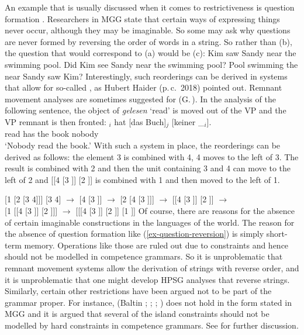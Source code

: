 \documentclass[output=paper,biblatex,babelshorthands,newtxmath,draftmode,colorlinks,citecolor=brown]{langscibook}
\begin{document}
An example that is usually discussed when it comes to restrictiveness is question
formation \citep{MMGRRBW2003a}. Researchers in MGG state that certain ways of expressing things never occur, although
they may be imaginable. So some may ask why questions are never formed by reversing the
order of words in a string. So rather than (b), the question that would correspond to
(a) would be (c):
\eal
\ex Kim saw Sandy near the swimming pool.
\ex Did Kim see Sandy near the swimming pool?
\ex\label{ex-question-reversion} 
Pool swimming the near Sandy saw Kim?
\zl
\largerpage
Interestingly, such reorderings can be derived in systems that allow for so-called
\emph{}, as Hubert Haider (p.\,c.\ 2018) pointed
out. Remnant movement analyses are sometimes suggested for 
(G.\,\citealp{GMueller98a}). In the analysis of the following sentence, the object of \emph{gelesen}
`read' is moved out of the VP and the VP remnant is then fronted:
\ea
{}$_i$ hat [das Buch]$_j$ [keiner \_$_i$].\\
     {}        {}     read         has \spacebr{}the book \spacebr{}nobody\\
\glt `Nobody read the book.'
\z
\noindent
With such a system in place, the reorderings can be derived as follows: the element 3 is combined
with 4, 4 moves to the left of 3. The result is combined with 2 and then the unit containing 3
and 4 can move to the left of 2 and [[4 [3 \trace]] [2 \trace]] is combined with 1 and then moved to the left of 1.

\eal
\ex{} [1 [2 [3 4]]] 
\ex {} [3 4] $\to$ [4 [3 \trace]] $\to$ [2 [4 [3 \trace]]] $\to$ [[4 [3 \trace]] [2 \trace]] $\to$\\
    {} [1 [[4 [3 \trace]] [2 \trace]]] $\to$ [[[4 [3 \trace]] [2 \trace]] [1 \trace]]
\zl
Of course, there are reasons for the absence of certain imaginable constructions in the languages of
the world. The reason for the absence of question formation like (\ref{ex-question-reversion}) is
simply short-term memory. Operations like those are ruled out due to  constraints and
hence should not be modelled in competence grammars. So it is unproblematic that remnant movement
systems allow the derivation of strings with reverse order, and it is unproblematic that one might
develop HPSG analyses that reverse strings. Similarly, certain other restrictions have been argued
not to be part of the grammar proper. For instance,  (Baltin \citeyear[]{Baltin81a};
\citeyear{Baltin2006a}; \citealp[]{Rizzi82b}; \citealp[--40]{Chomsky86b}) does not hold in the form stated in
MGG \parencites{Mueller2004d}[Section~13.1.5]{MuellerGT-Eng1} and it is argued that several of the
island constraints should not be modelled by hard constraints in competence grammars. See
 for further discussion. 
\end{document}
